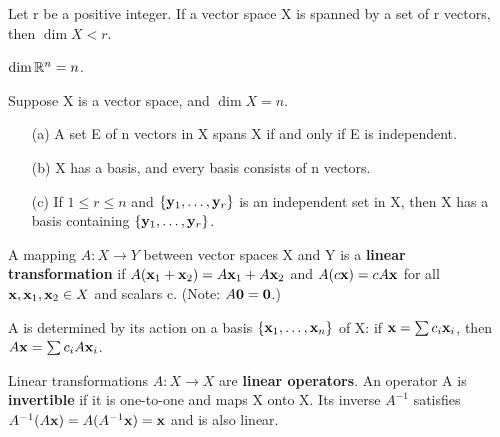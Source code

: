 

\begin{theorem}
  \label{thm:chap9:span_implies_dim_lt_r}
  Let r be a positive integer. If a vector space X is spanned by a
  set of r vectors, then $\dim X < r$.
\end{theorem}

\begin{corollary}
  \label{cor:chap9:dim_Rn_is_n}
  $\dim \mathbb{R}^n = n$.
\end{corollary}



\begin{theorem}
  \label{thm:chap9:basis_properties}
  Suppose X is a vector space, and $\dim X = n$.
  \begin{enumerate}
    \item[(a)] A set E of n vectors in X spans X if and only if E is
      independent.
    \item[(b)] X has a basis, and every basis consists of n vectors.
    \item[(c)] If $1 \le r \le n$ and $\{ \mathbf{y}_1, \dots,
      \mathbf{y}_r \}$ is an independent set in X, then X has a basis
      containing $\{ \mathbf{y}_1, \dots, \mathbf{y}_r \}$.
  \end{enumerate}
\end{theorem}


\begin{definition}
  \label{def:chap9:linear_transformation}
  A mapping $A: X \to Y$ between vector spaces X and Y is a
  \textbf{linear transformation} if $A(\mathbf{x}_1 + \mathbf{x}_2) =
  A\mathbf{x}_1 + A\mathbf{x}_2$ and $A(c\mathbf{x}) = cA\mathbf{x}$ for all
  $\mathbf{x}, \mathbf{x}_1, \mathbf{x}_2 \in X$ and scalars c. (Note:
  $A\mathbf{0} = \mathbf{0}$.)

  A is determined by its action on a basis $\{ \mathbf{x}_1, \dots,
  \mathbf{x}_n \}$ of X: if $\mathbf{x} = \sum c_i \mathbf{x}_i$, then
  $A\mathbf{x} = \sum c_i A\mathbf{x}_i$.

  Linear transformations $A: X \to X$ are \textbf{linear operators}.
  An operator A is \textbf{invertible} if it is one-to-one and maps X
  onto X. Its inverse $A^{-1}$ satisfies $A^{-1}(A\mathbf{x}) =
  A(A^{-1}\mathbf{x}) = \mathbf{x}$ and is also linear.
\end{definition}


